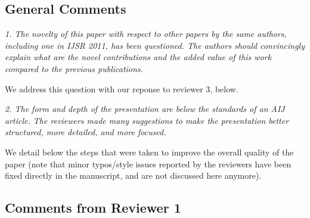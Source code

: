 \documentclass{letter}
\begin{document}
\subsection{General Comments}

\emph{1. The novelty of this paper with respect to other papers by the same
authors, including one in IJSR 2011, has been questioned. The authors
should convincingly explain what are the novel contributions and the
added value of this work compared to the previous publications.}

We address this question with our reponse to reviewer 3, below.

\emph{2. The form and depth of the presentation are below the standards of an
AIJ article.  The reviewers made many suggestions to make the presentation
better structured, more detailed, and more focused.}

We detail below the steps that were taken to improve the overall quality of the
paper (note that minor typos/style issues reported by the reviewers have been
fixed directly in the manuscript, and are not discussed here anymore).


\subsection{Comments from Reviewer 1}

\end{document}
